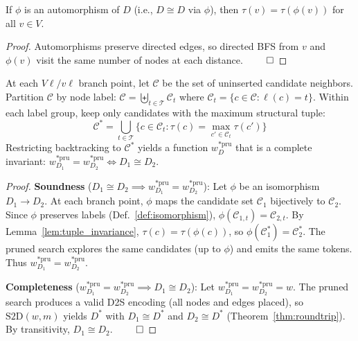 \begin{lemma}
\label{lem:tuple_invariance}
If $\phi$ is an automorphism of $D$ (i.e., $D \cong D$ via $\phi$), then
$\tau(v) = \tau(\phi(v))$ for all $v \in V$.
\end{lemma}

\begin{proof}
Automorphisms preserve directed edges, so directed BFS from $v$ and $\phi(v)$
visit the same number of nodes at each distance. $\qed$
\end{proof}

\begin{proposition}
\label{prop:pruning}
At each $V\ell/v\ell$ branch point, let $\mathcal{C}$ be the set of uninserted
candidate neighbors. Partition $\mathcal{C}$ by node label:
$\mathcal{C} = \biguplus_{t \in \mathcal{T}} \mathcal{C}_t$ where
$\mathcal{C}_t = \{c \in \mathcal{C} : \ell(c) = t\}$.
Within each label group, keep only candidates with the maximum structural tuple:
\[
  \mathcal{C}^* = \bigcup_{t \in \mathcal{T}}
    \{c \in \mathcal{C}_t : \tau(c) = \max_{c' \in \mathcal{C}_t} \tau(c')\}
\]
Restricting backtracking to $\mathcal{C}^*$ yields a function $w^{*\text{pru}}_D$
that is a complete invariant: $w^{*\text{pru}}_{D_1} = w^{*\text{pru}}_{D_2}
\iff D_1 \cong D_2$.
\end{proposition}

\begin{proof}
\textbf{Soundness} ($D_1 \cong D_2 \implies w^{*\text{pru}}_{D_1} = w^{*\text{pru}}_{D_2}$):
Let $\phi$ be an isomorphism $D_1 \to D_2$. At each branch point, $\phi$ maps the
candidate set $\mathcal{C}_1$ bijectively to $\mathcal{C}_2$.
Since $\phi$ preserves labels (Def.~\ref{def:isomorphism}), $\phi(\mathcal{C}_{1,t}) = \mathcal{C}_{2,t}$.
By Lemma~\ref{lem:tuple_invariance}, $\tau(c) = \tau(\phi(c))$, so
$\phi(\mathcal{C}^*_1) = \mathcal{C}^*_2$. The pruned search explores the same
candidates (up to $\phi$) and emits the same tokens. Thus $w^{*\text{pru}}_{D_1} = w^{*\text{pru}}_{D_2}$.

\textbf{Completeness} ($w^{*\text{pru}}_{D_1} = w^{*\text{pru}}_{D_2} \implies D_1 \cong D_2$):
Let $w^{*\text{pru}}_{D_1} = w^{*\text{pru}}_{D_2} = w$. The pruned search produces
a valid D2S encoding (all nodes and edges placed), so $\text{S2D}(w, m)$ yields $D^*$ with
$D_1 \cong D^*$ and $D_2 \cong D^*$ (Theorem~\ref{thm:roundtrip}).
By transitivity, $D_1 \cong D_2$. $\qed$
\end{proof}


